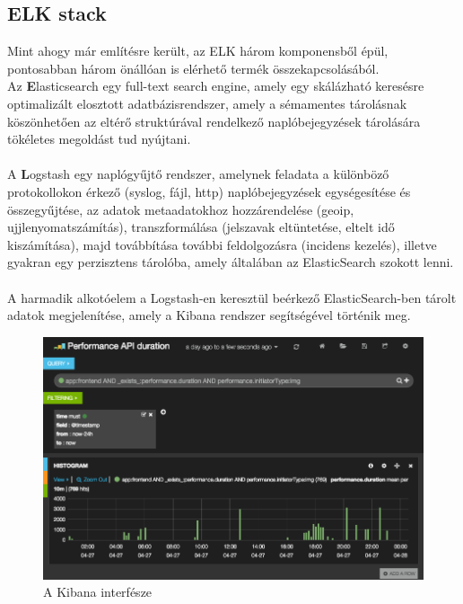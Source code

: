 \subsection{ELK stack}
Mint ahogy már említésre került, az ELK három komponensből épül, pontosabban három önállóan is elérhető termék összekapcsolásából.\\
Az \textbf{E}lasticsearch egy full-text search engine, amely egy skálázható keresésre optimalizált elosztott adatbázisrendszer, amely a sémamentes tárolásnak köszönhetően az eltérő struktúrával rendelkező naplóbejegyzések tárolására tökéletes megoldást tud nyújtani.\\
\hfill\\
A \textbf{L}ogstash egy naplógyűjtő rendszer, amelynek feladata a különböző protokollokon érkező (syslog, fájl, http) naplóbejegyzések egységesítése és összegyűjtése, az adatok metaadatokhoz hozzárendelése (geoip, ujjlenyomatszámítás), transzformálása (jelszavak eltüntetése, eltelt idő kiszámítása), majd továbbítása további feldolgozásra (incidens kezelés), illetve gyakran egy perzisztens tárolóba, amely általában az ElasticSearch szokott lenni.\\
\hfill\\
A harmadik alkotóelem a Logstash-en keresztül beérkező ElasticSearch-ben tárolt adatok megjelenítése, amely a Kibana rendszer segítségével történik meg.

\begin{figure}[H]
	\centering
		\includegraphics[scale=0.5]{assets/elk.png}%
		\caption[DUMMY]%
		{A Kibana interfésze}%
		\label{fig:kibana-webinterface}
\end{figure}

